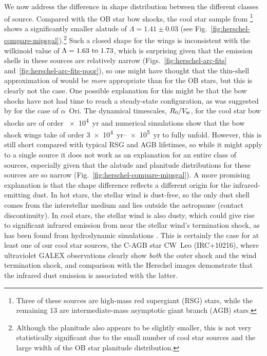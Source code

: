 We now address the difference in shape distribution between the
different classes of source.  Compared with the OB star bow shocks,
the cool star sample from \citet{Cox:2012a}\footnote{Three of these
  sources are high-mass red supergiant (RSG) stars, while the
  remaining 13 are intermediate-mass asymptotic giant branch (AGB)
  stars.} shows a significantly smaller alatude of
\(\Lambda = 1.41 \pm 0.03\) (see
Fig.~\ref{fig:herschel-compare-mipsgal}).\footnote{Although the
  planitude also appears to be slightly smaller, this is not very
  statistically significant due to the small number of cool star
  sources and the large width of the OB star planitude distribution.}
Such a closed shape for the wings is inconsistent with the wilkinoid
value of \(\Lambda = \text{\numrange{1.63}{1.73}}\), which is surprising
given that the emission shells in these sources are relatively narrow
(Figs.~\ref{fig:herschel-arc-fits}
and~\ref{fig:herschel-arc-fits-poor}), so one might have thought that
the thin-shell approximation of \citet{Wilkin:1996a} would be
\emph{more} appropriate than for the OB stars, but this is clearly not
the case.  One possible explanation for this might be that the bow
shocks have not had time to reach a steady-state configuration, as was
suggested by \citet{Mohamed:2012a} for the case of \(\alpha\)~Ori.  The
dynamical timescales, \(R_0 / V_{\text{w}}\), for the cool star bow shocks
are of order \SI{e4}{yr} and numerical simulations \citetext{e.g.,
  Fig.~11 of \citealp{Mohamed:2012a} and Fig.~2 of
  \citealp{van-Marle:2014a}} show that the bow shock wings take of
order \SIrange{3e4}{e5}{yr} to fully unfold.  However, this is still
short compared with typical RSG and AGB lifetimes, so while it might
apply to a single source it does not work as an explanation for an
entire class of sources, especially given that the alatude and
planitude distributions for these sources are so narrow
(Fig.~\ref{fig:herschel-compare-mipsgal}).  A more promising
explanation is that the shape difference reflects a different origin
for the infrared-emitting dust.  In hot stars, the stellar wind is
dust-free, so the only dust shell comes from the interstellar medium
and lies outside the astropause (contact discontinuity).  In cool
stars, the stellar wind is also dusty, which could give rise to
significant infrared emission from near the stellar wind's termination
shock, as has been found from hydrodynamic simulations
\citep{Meyer:2014b}.  This is certainly the case for at least one of
our cool star sources, the C-AGB star CW~Leo (IRC+10216), where
ultraviolet GALEX observations \citep{Sahai:2010a} clearly show
\emph{both} the outer shock and the wind termination shock, and
comparison with the Herschel images demonstrate that the infrared dust
emission is associated with the latter.


